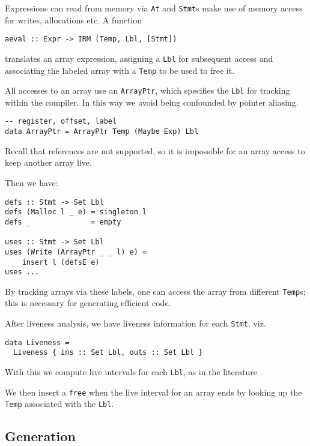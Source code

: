 \documentclass[sigplan,screen,anonymous]{acmart}
\begin{document}
Expressions can read from memory via {\tt At} and {\tt Stmt}s make use of memory access for writes, allocations etc. A function

\begin{verbatim}
aeval :: Expr -> IRM (Temp, Lbl, [Stmt])
\end{verbatim}
translates an array expression, assigning a {\tt Lbl} for subsequent access and associating the labeled array with a {\tt Temp} to be used to free it.

All accesses to an array use an {\tt ArrayPtr}, which specifies the {\tt Lbl} for tracking within the compiler. In this way we avoid being confounded by pointer aliasing.

\begin{verbatim}
-- register, offset, label
data ArrayPtr = ArrayPtr Temp (Maybe Exp) Lbl
\end{verbatim}

Recall that references are not supported, so it is impossible for an array access to keep another array live.

Then we have:

\begin{verbatim}
defs :: Stmt -> Set Lbl
defs (Malloc l _ e) = singleton l
defs _              = empty

uses :: Stmt -> Set Lbl
uses (Write (ArrayPtr _ _ l) e) =
    insert l (defsE e)
uses ...
\end{verbatim}

By tracking arrays via these labels, one can access the array from different {\tt Temp}s; this is necessary for generating efficient code.

After liveness analysis, we have liveness information for each {\tt Stmt}, viz.

\begin{verbatim}
data Liveness =
  Liveness { ins :: Set Lbl, outs :: Set Lbl }
\end{verbatim}

With this we compute live intervals for each {\tt Lbl}, as in the literature \cite{poletto1999}.

We then insert a {\tt free} when the live interval for an array ends by looking up the {\tt Temp} associated with the {\tt Lbl}.

\subsection{Generation}
\end{document}
